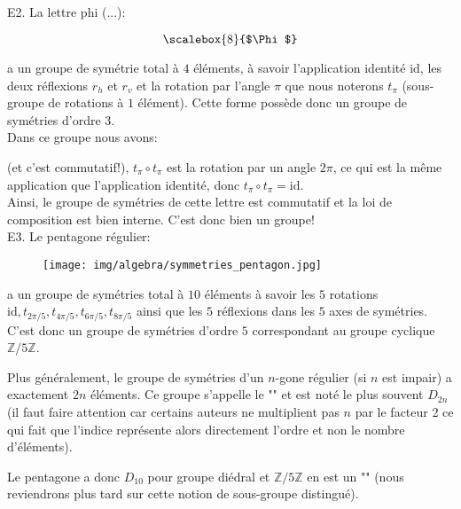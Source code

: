 	\pagebreak
	\begin{tcolorbox}[colframe=black,colback=white,sharp corners]
	E2. La lettre phi (...):
	\begin{center}
	\[ \scalebox{8}{$\Phi$} \]
	\end{center}
	a un groupe de symétrie total à $4$ éléments, à savoir l'application identité $\text{id}$, les deux réflexions $r_h$ et $r_v$ et la rotation par l'angle $\pi$ que nous noterons $t_\pi$ (sous-groupe de rotations à $1$ élément). Cette forme possède donc un groupe de symétries d'ordre $3$.\\
	
	Dans ce groupe nous avons:
	
 	(et c'est commutatif!), $t_{\pi}\circ t_{\pi}$ est la rotation par un angle  $2\pi$, ce qui est la même application que l'application identité, donc $t_{\pi}\circ t_\pi=\text{id}$.\\
 	
 	Ainsi, le groupe de symétries de cette lettre est commutatif et la loi de composition est bien interne. C'est donc bien un groupe!\\
 	
 	E3. Le pentagone régulier:
 	\begin{figure}[H]
		\centering
		\texttt{[image: img/algebra/symmetries\_pentagon.jpg]}
	\end{figure}
	a un groupe de symétries total à $10$ éléments à savoir les $5$ rotations $\text{id},t_{2\pi/5},t_{4\pi/5},t_{6\pi/5},t_{8\pi/5}$ ainsi que les $5$ réflexions dans les $5$ axes de symétries. C'est donc un groupe de symétries d'ordre $5$ correspondant au groupe cyclique $\mathbb{Z}/ 5\mathbb{Z}$.
	\begin{tcolorbox}[title=Remarque,colframe=black,arc=10pt]
	Plus généralement, le groupe de symétries d'un $n$-gone régulier (si $n$ est impair) a exactement $2n$ éléments. Ce groupe s'appelle le "" et est noté le plus souvent $D_{2n}$ (il faut faire attention car certains auteurs ne multiplient pas $n$ par le facteur $2$ ce qui fait que l'indice représente alors directement l'ordre et non le nombre d'éléments).
	\end{tcolorbox}	
	Le pentagone a donc $D_{10}$ pour groupe diédral et $\mathbb{Z}/ 5\mathbb{Z}$ en est un "" (nous reviendrons plus tard sur cette notion de sous-groupe distingué).
	\end{tcolorbox}
	
